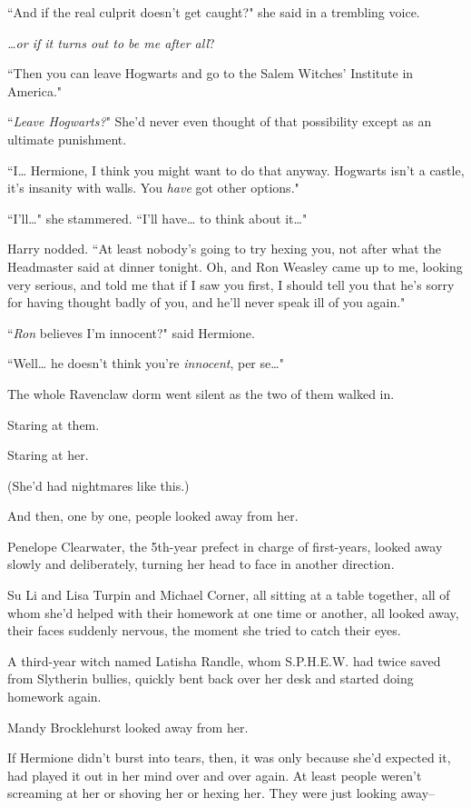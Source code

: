 ``And if the real culprit doesn't get caught?" she said in a trembling voice.

\emph{{\ldots}or if it turns out to be me after all}?

``Then you can leave Hogwarts and go to the Salem Witches' Institute in America."

``\emph{Leave Hogwarts?}" She'd never even thought of that possibility except as an ultimate punishment.

``I{\ldots} Hermione, I think you might want to do that anyway. Hogwarts isn't a castle, it's insanity with walls. You \emph{have} got other options."

``I'll{\ldots}" she stammered. ``I'll have{\ldots} to think about it{\ldots}"

Harry nodded. ``At least nobody's going to try hexing you, not after what the Headmaster said at dinner tonight. Oh, and Ron Weasley came up to me, looking very serious, and told me that if I saw you first, I should tell you that he's sorry for having thought badly of you, and he'll never speak ill of you again."

``\emph{Ron} believes I'm innocent?" said Hermione.

``Well{\ldots} he doesn't think you're \emph{innocent}, per se{\ldots}"

\later

The whole Ravenclaw dorm went silent as the two of them walked in.

Staring at them.

Staring at her.

(She'd had nightmares like this.)

And then, one by one, people looked away from her.

Penelope Clearwater, the 5th-year prefect in charge of first-years, looked away slowly and deliberately, turning her head to face in another direction.

Su Li and Lisa Turpin and Michael Corner, all sitting at a table together, all of whom she'd helped with their homework at one time or another, all looked away, their faces suddenly nervous, the moment she tried to catch their eyes.

A third-year witch named Latisha Randle, whom S.P.H.E.W. had twice saved from Slytherin bullies, quickly bent back over her desk and started doing homework again.

Mandy Brocklehurst looked away from her.

If Hermione didn't burst into tears, then, it was only because she'd expected it, had played it out in her mind over and over again. At least people weren't screaming at her or shoving her or hexing her. They were just looking away\---

